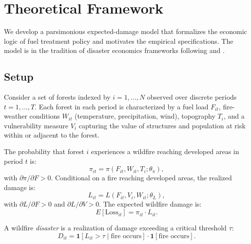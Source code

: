 \documentclass[12pt, letterpaper]{article}
\begin{document}
\section{Theoretical Framework}\label{sec:theory}

We develop a parsimonious expected-damage model that formalizes the economic logic of fuel treatment policy and motivates the empirical specifications. The model is in the tradition of disaster economics frameworks following \citet{kunreuther1996} and \citet{kousky2014}.

\subsection{Setup}

Consider a set of forests indexed by $i = 1, \ldots, N$ observed over discrete periods $t = 1, \ldots, T$. Each forest in each period is characterized by a fuel load $F_{it}$, fire-weather conditions $W_{it}$ (temperature, precipitation, wind), topography $T_i$, and a vulnerability measure $V_i$ capturing the value of structures and population at risk within or adjacent to the forest.

The probability that forest $i$ experiences a wildfire reaching developed areas in period $t$ is:
\begin{equation}
\pi_{it} = \pi(F_{it}, W_{it}, T_i; \theta_\pi),
\label{eq:fire_prob}
\end{equation}
with $\partial \pi / \partial F > 0$. Conditional on a fire reaching developed areas, the realized damage is:
\begin{equation}
L_{it} = L(F_{it}, V_i, W_{it}; \theta_L),
\label{eq:damage}
\end{equation}
with $\partial L / \partial F > 0$ and $\partial L / \partial V > 0$. The expected wildfire damage is:
\begin{equation}
E[\text{Loss}_{it}] = \pi_{it} \cdot L_{it}.
\label{eq:expected_loss}
\end{equation}

A wildfire \textit{disaster} is a realization of damage exceeding a critical threshold $\tau$:
\begin{equation}
D_{it} = \mathbf{1}[L_{it} > \tau \mid \text{fire occurs}] \cdot \mathbf{1}[\text{fire occurs}].
\label{eq:disaster_def}
\end{equation}
\end{document}

